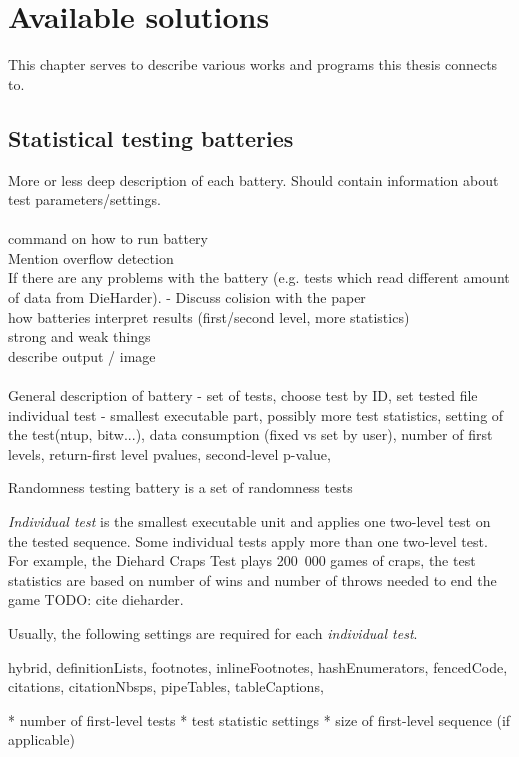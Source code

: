 \documentclass[
  digital,     %
  oneside,     %
  nosansbold,  %
  nocolorbold, %
  nolof,         %
  nolot,         %
]{fithesis4}
\begin{document}

\chapter{Available solutions}


This chapter serves to describe various works and programs this thesis connects to.


\section{Statistical testing batteries}
More or less deep description of each battery. Should contain information about test parameters/settings.\\
\\
command on how to run battery\\
Mention overflow detection\\
If there are any problems with the battery (e.g. tests which read different amount of data from DieHarder). - Discuss colision with the paper\\
how batteries interpret results (first/second level, more statistics)\\
strong and weak things \\
describe output / image\\
\\

General description of battery - set of tests, choose test by ID, set tested file \\
individual test - smallest executable part, possibly more test statistics, setting of the test(ntup, bitw...), data consumption (fixed vs set by user), number of first levels, return-first level pvalues, second-level p-value,

Randomness testing battery is a set of randomness tests

\emph{Individual test} is the smallest executable unit and applies one two-level test on the tested sequence. Some individual tests apply more than one two-level test. For example, the Diehard Craps Test plays 200~000 games of craps, the test statistics are based on number of wins and number of throws needed to end the game TODO: cite dieharder.

Usually, the following settings are required for each \emph{individual test}.
\begin{markdown*}{%
  hybrid,
  definitionLists,
  footnotes,
  inlineFootnotes,
  hashEnumerators,
  fencedCode,
  citations,
  citationNbsps,
  pipeTables,
  tableCaptions,
}

* number of first-level tests
* test statistic settings
* size of first-level sequence (if applicable)


\end{markdown*}
\end{document}
